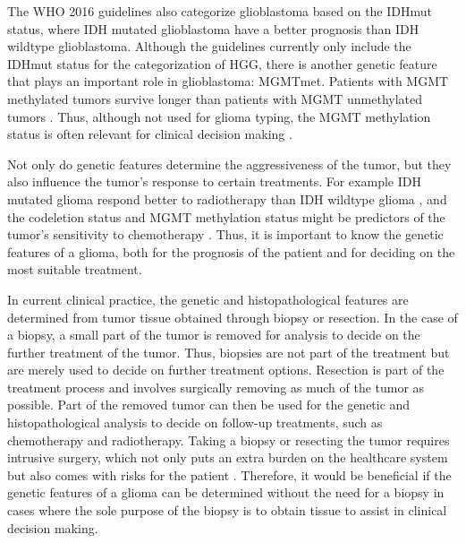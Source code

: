 The \gls{WHO} 2016 guidelines also categorize \gls{glioblastoma} based on the \gls{IDHmut} status, where \gls{IDH} mutated \gls{glioblastoma} have a better prognosis than \gls{IDH} wildtype \gls{glioblastoma}.
Although the guidelines currently only include the \gls{IDHmut} status for the categorization of \gls{HGG}, there is another genetic feature that plays an important role in \gls{glioblastoma}: \gls{MGMTmet}.
Patients with \gls{MGMT} methylated \glspl{tumor} survive longer than patients with \gls{MGMT} unmethylated \glspl{tumor} \autocite{martinez2007MGMT, gessler2018MGMT, weller2009molecularGBM}.
Thus, although not used for \gls{glioma} typing, the \gls{MGMT} methylation status is often relevant for clinical decision making \autocite{molinaro2019geneticepidemiology}.

Not only do genetic features determine the aggressiveness of the \gls{tumor}, but they also influence the \gls{tumor}'s response to certain treatments.
For example \gls{IDH} mutated \gls{glioma} respond better to radiotherapy than \gls{IDH} wildtype \gls{glioma} \autocite{juratli2015IDHtreatment}, and the \gls{codeletion} status and \gls{MGMT} methylation status might be predictors of the \gls{tumor}'s sensitivity to chemotherapy \autocite{idbaih2007markersresponse}.
Thus, it is important to know the genetic features of a \gls{glioma}, both for the prognosis of the patient and for deciding on the most suitable treatment.

In current clinical practice, the genetic and histopathological features are determined from \gls{tumor} tissue obtained through biopsy or resection.
In the case of a biopsy, a small part of the \gls{tumor} is removed for analysis to decide on the further treatment of the \gls{tumor}.
Thus, biopsies are not part of the treatment but are merely used to decide on further treatment options.
Resection is part of the treatment process and involves surgically removing as much of the \gls{tumor} as possible.
Part of the removed \gls{tumor} can then be used for the genetic and histopathological analysis to decide on follow-up treatments, such as chemotherapy and radiotherapy.
Taking a biopsy or resecting the \gls{tumor} requires intrusive surgery, which not only puts an extra burden on the healthcare system but also comes with risks for the patient \autocite{chen2009biopsy}.
Therefore, it would be beneficial if the genetic features of a \gls{glioma} can be determined without the need for a biopsy in cases where the sole purpose of the biopsy is to obtain tissue to assist in clinical decision making.

